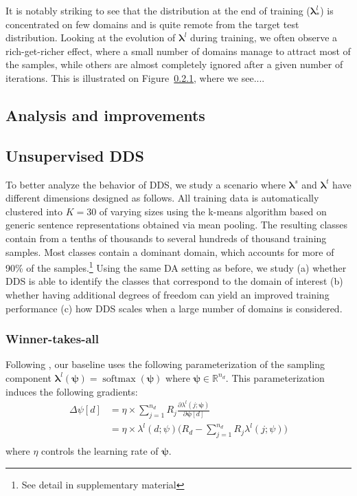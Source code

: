\documentclass[11pt,a4paper]{article}
\newcommand{\fyTodo}[1]{\Todo[FY:]{\textcolor{orange}{#1}}}
\newcommand{\vlambda}{\ensuremath{\boldsymbol\lambda}\xspace} %
\newcommand{\vpsi}{\ensuremath{\boldsymbol\psi}\xspace} %
\begin{document}
It is notably striking to see that the distribution at the end of training ($\vlambda^l_*$) is concentrated on few domains and is quite remote from the target test distribution. Looking at the evolution of $\vlambda^l$ during training, we often observe a rich-get-richer effect, where a small number of domains manage to attract most of the samples, while others are almost completely ignored after a given number of iterations. This is illustrated on Figure~\ref{}, where we see....\fyTodo{Provide illustrations and numbers}

\subsection{Analysis and improvements}

\subsection{Unsupervised DDS}
To better analyze the behavior of DDS, we study a scenario where $\vlambda^s$ and $\vlambda^t$ have different dimensions designed as follows. All training data is automatically clustered into $K=30$ of varying sizes using the k-means algorithm based on generic sentence representations obtained via mean pooling. The resulting classes contain from a tenths of thousands to several hundreds of thousand training samples. Most classes contain a dominant domain, which accounts for more of 90\% of the samples.\footnote{See detail in supplementary material} Using the same DA setting as before, we study (a) whether DDS is able to identify the classes that correspond to the domain of interest (b) whether having additional degrees of freedom can yield an improved training performance (c) how DDS scales when a large number of  domains is considered.\fyTodo{TBC - with what experiments?}

\subsubsection{Winner-takes-all}

Following \citep{Wang20balancing}, our baseline uses the following parameterization of the sampling component $\vlambda^l(\vpsi) = \operatorname{softmax}(\vpsi)$ where $\vpsi \in \mathbb{R}^{n_d}$. This parameterization induces the following gradients:\fyTodo{Change name of obj. function}
\begin{align*}
\Delta \psi[d] & = \eta \times \displaystyle{\mathop{\sum}_{j=1}^{n_d}} R_j \frac{\partial \lambda^l(j; \vpsi)}{\partial \vpsi[d]} \\
	& = \eta \times \lambda^l(d; \psi) \big(R_d-\displaystyle{\mathop{\sum}_{j=1}^{n_d}} R_j \lambda^l(j;\psi) \big)\\
\end{align*}
where $\eta$ controls the learning rate of $\vpsi$.
\end{document}

